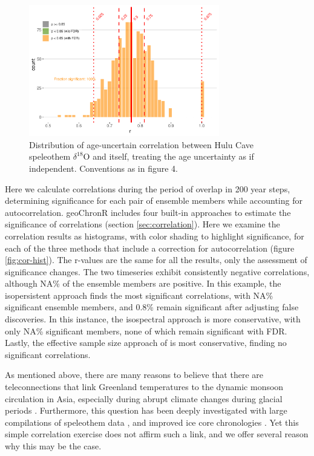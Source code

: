 \documentclass[gchron, manuscript]{copernicus}
\begin{document}
\begin{figure}
\includegraphics[width=8.3cm]{geoChronR-paper_files/figure-latex/hulu-cor-hist-1} \caption{Distribution of age-uncertain correlation between Hulu Cave speleothem $\delta^{18}$O and itself, treating the age uncertainty as if independent. Conventions as in figure 4.}\label{fig:hulu-cor-hist}
\end{figure}

Here we calculate correlations during the period of overlap in 200 year steps, determining significance for each pair of ensemble members while accounting for autocorrelation.
geoChronR includes four built-in approaches to estimate the significance of correlations (section \ref{sec:correlation}).
Here we examine the correlation results as histograms, with color shading to highlight significance, for each of the three methods that include a correction for autocorrelation (figure \ref{fig:cor-hist}).
The r-values are the same for all the results, only the assessment of significance changes.
The two timeseries exhibit consistently negative correlations, although NA\% of the ensemble members are positive.
In this example, the isopersistent approach finds the most significant correlations, with NA\% significant ensemble members, and 0.8\% remain significant after adjusting false discoveries.
In this instance, the isospectral approach is more conservative, with only NA\% significant members, none of which remain significant with FDR.
Lastly, the effective sample size approach of \citet{dawdy1964statistical} is most conservative, finding no significant correlations.

As mentioned above, there are many reasons to believe that there are teleconnections that link Greenland temperatures to the dynamic monsoon circulation in Asia, especially during abrupt climate changes during glacial periods \citep[e.g.][]{liu2013links, duan2016onset, zhang2019asian}.
Furthermore, this question has been deeply investigated with large compilations of speleothem data \citep{corrick2020synchronous}, and improved ice core chronologies \citep[e.g.][]{andersen2006greenland, wolff2010millennial}.
Yet this simple correlation exercise does not affirm such a link, and we offer several reason why this may be the case.
\end{document}
